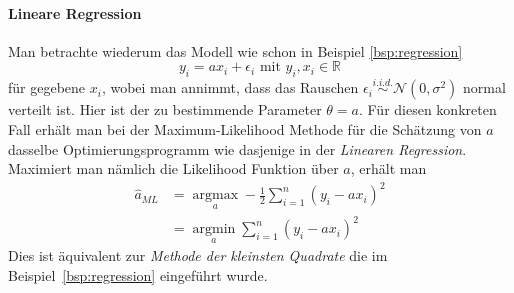 \paragraph{Lineare Regression} 
Man betrachte wiederum das Modell wie schon in Beispiel \ref{bsp:regression}
\begin{equation*} 
y_{i} = ax_{i}+\epsilon_{i} \text{ mit } y_{i}, x_{i} \in \mathbb{R}
\end{equation*}
f\"ur gegebene $x_i$, wobei man annimmt, dass das Rauschen $\epsilon_i \overset{i.i.d.}{\sim} \mathcal{N}(0,\sigma^2)$ normal verteilt ist. Hier ist der zu bestimmende Parameter $\theta = a$. F\"ur diesen konkreten Fall erh\"alt man bei der Maximum-Likelihood Methode f\"ur die Sch\"atzung von $a$ dasselbe Optimierungsprogramm wie dasjenige in der \textit{Linearen Regression}. Maximiert man n\"amlich die Likelihood Funktion \"uber $a$, erh\"alt man
\begin{align*}
\hat{a}_{ML} &= \underset{a}{\operatorname{argmax}} -\frac{1}{2} \sum_{i=1}^{n} (y_{i} -ax_{i})^{2}\\
&= \underset{a}{\operatorname{argmin}} \sum_{i=1}^n (y_i - ax_i)^2
\end{align*}
Dies ist \"aquivalent zur \textit{Methode der kleinsten Quadrate} die im Beispiel~\ref{bsp:regression} eingef\"uhrt wurde.


